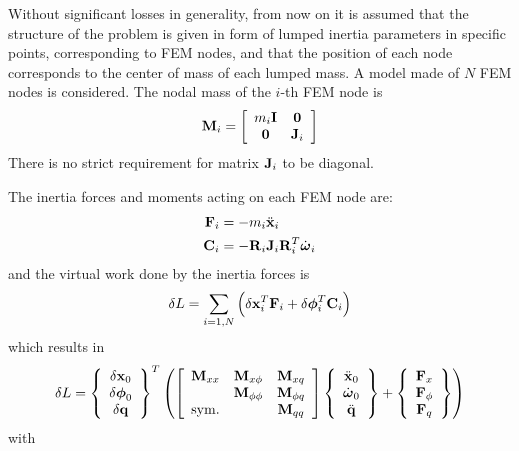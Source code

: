 Without significant losses in generality, from now on it is assumed
that the structure of the problem is given in form of lumped inertia
parameters in specific points, corresponding to FEM nodes,
and that the position of each node corresponds to the center of mass
of each lumped mass.
A model made of $N$ FEM nodes is considered.
The nodal mass of the $i$-th FEM node is
\begin{equation}
	\T{M}_i = \sqbr{\matr{cc}{
		m_i \T{I} & \T{0} \\
		\T{0} & \T{J}_i
	}}
\end{equation}
There is no strict requirement for matrix $\T{J}_i$ to be diagonal.

The inertia forces and moments acting on each FEM node are:
\begin{subequations}
\begin{align}
	\T{F}_i &= - m_i \ddot{\T{x}}_i \\
	\T{C}_i &= - \T{R}_i \T{J}_i \T{R}_i^T \dot{\T{\omega}}_i
\end{align}
\end{subequations}
and the virtual work done by the inertia forces is
\begin{equation}
	\delta{L} = \sum_{i=1,N} \plbr{
		\delta{\T{x}}_i^T \T{F}_i
		+ \delta\T{\phi}_i^T \T{C}_i
	}
\end{equation}
which results in
\begin{equation}
	\delta{L} = \cubr{\cvvect{
		\delta\T{x}_0 \\
		\delta\T{\phi}_0 \\
		\delta\T{q}
	}}^T \plbr{
	\sqbr{\matr{ccc}{
		\T{M}_{xx} & \T{M}_{x\phi} & \T{M}_{xq} \\
			& \T{M}_{\phi\phi} & \T{M}_{\phi q} \\
		\llk{sym.} & & \T{M}_{qq}
	}} \cubr{\cvvect{
		\ddot{\T{x}}_0 \\
		\dot{\T{\omega}}_0 \\
		\ddot{\T{q}}
	}} + \cubr{\cvvect{
		\T{F}_x \\
		\T{F}_{\phi} \\
		\T{F}_q
	}}
	}
\end{equation}
with
